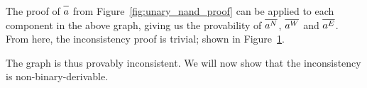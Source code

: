 The proof of $\ol{a}$ from Figure~\ref{fig:unary_nand_proof} can be applied to each component in the above graph, giving us the provability of $\ol{a^N}$, $\ol{a^W}$ and $\ol{a^E}$.
From here, the inconsistency proof is trivial; shown in Figure~\ref{fig:triple_double_open_door_proof}.\par
\begin{figure}[!h]
  \centering
  \begin{prooftree*}
    \Hypo{\dots}
    \Hypo{\dots}
    \Hypo{\dots}
  \end{prooftree*}
  \caption{}
  \label{fig:triple_double_open_door_proof}
\end{figure}
The graph is thus provably inconsistent.
We will now show that the inconsistency is non-binary-derivable.
